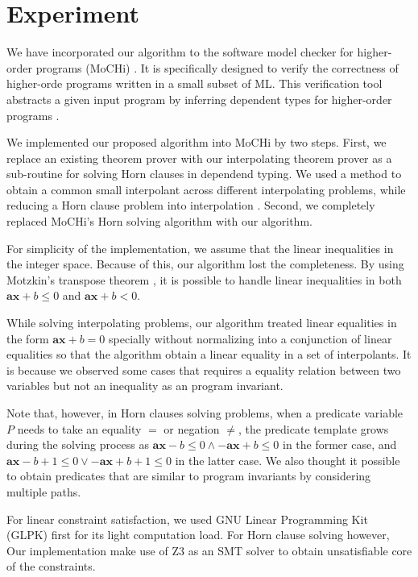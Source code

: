 \chapter{Experiment}
\label{chap:experiment}

We have incorporated our algorithm to the software model checker for
higher-order programs (MoCHi) \cite{conf/pldi/KobayashiSU11}.  It is
specifically designed to verify the correctness of higher-orde
programs written in a small subset of ML.  This verification tool
abstracts a given input program by inferring dependent types for
higher-order programs \cite{conf/ppdp/UnnoK09}.

We implemented our proposed algorithm into MoCHi by two steps.  First,
we replace an existing theorem prover with our interpolating theorem
prover as a sub-routine for solving Horn clauses in dependend typing.
We used a method to obtain a common small interpolant across different
interpolating problems, while reducing a Horn clause problem into
interpolation \cite{conf/ppdp/UnnoK09}.  Second, we completely
replaced MoCHi's Horn solving algorithm with our algorithm.

For simplicity of the implementation, we assume that the linear
inequalities in the integer space.  Because of this, our algorithm
lost the completeness.  By using Motzkin's transpose theorem
\cite{journals/networks/Rajan90}, it is possible to handle linear
inequalities in both $\mathbf{ax} + b \leq 0$ and $\mathbf{ax} + b <
0$.

While solving interpolating problems, our algorithm treated linear
equalities in the form $\mathbf{ax} + b = 0$ specially without
normalizing into a conjunction of linear equalities so that the
algorithm obtain a linear equality in a set of interpolants.  It is
because we observed some cases that requires a equality relation
between two variables but not an inequality as an program invariant.

Note that, however, in Horn clauses solving problems, when a predicate
variable $P$ needs to take an equality $=$ or negation $\neq$, the
predicate template grows during the solving process as
$\mathbf{ax}-b \leq 0 \wedge -\mathbf{ax}+b \leq 0$ in the former
case, and $\mathbf{ax}-b+1 \leq 0 \vee -\mathbf{ax}+b+1 \leq 0$ in the
latter case.  We also thought it possible to obtain predicates that
are similar to program invariants by considering multiple paths.

For linear constraint satisfaction, we used GNU Linear Programming Kit
(GLPK) first for its light computation load.  For Horn clause solving
however, Our implementation make use of Z3 \cite{conf/tacas/MouraB08}
as an SMT solver to obtain unsatisfiable core of the constraints.

